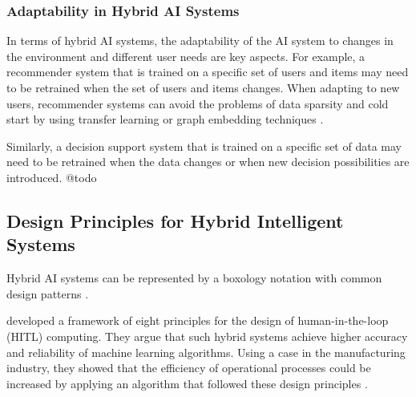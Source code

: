 \subsubsection{Adaptability in Hybrid AI Systems}

In terms of hybrid AI systems, the adaptability of the AI system to changes in the environment and different user needs are
key aspects. For example, a recommender system that is trained on a specific set of users and items may need to be retrained
when the set of users and items changes. When adapting to new users, recommender systems can avoid the problems of data sparsity
and cold start by using transfer learning or graph embedding techniques \citep{zhangArtificialIntelligenceRecommender2021,
dengRecommenderSystemsBased2022}.

Similarly, a decision support system that is trained on a specific set of data may
need to be retrained when the data changes or when new decision possibilities are introduced. {\color{purple} @todo}

\subsection{Design Principles for Hybrid Intelligent Systems}

Hybrid AI systems can be represented by a boxology notation with common design patterns \citep{harmelenBoxologyDesignPatterns2019,
vanbekkumModularDesignPatterns2021,witschelVisualizationPatternsHybrid2021}.

\cite{ostheimerAllianceHumansMachines2021} developed a framework of eight principles for the design of human-in-the-loop (HITL) 
computing. They argue that such hybrid systems achieve higher accuracy and reliability of machine learning algorithms. Using a 
case in the manufacturing industry, they showed that the efficiency of operational processes could be increased by applying an 
algorithm that followed these design principles \citep{ostheimerAllianceHumansMachines2021}.

